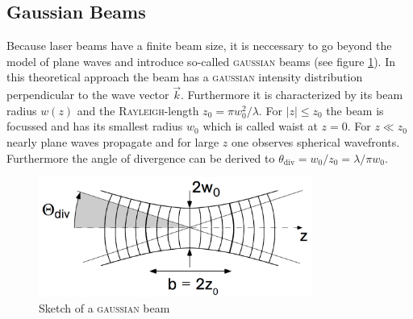 \documentclass{protokoll_en}
\begin{document}
\subsection{Gaussian Beams}
Because laser beams have a finite beam size, it is neccessary to go beyond the model of plane waves and introduce so-called \textsc{gaussian} beams (see figure \ref{fig:gaussianbeams}). In this theoretical approach the beam has a \textsc{gaussian} intensity distribution perpendicular to the wave vector $\vec{k}$. Furthermore it is characterized by its beam radius $w(z)$ and the \textsc{Rayleigh}-length $z_0 = \pi w^2_0/\lambda$. For $|z| \leq z_0$ the beam is focussed and has its smallest radius $w_0$ which is called waist at $z=0$. For $z \ll z_0$ nearly plane waves propagate and for large $z$ one observes spherical wavefronts. Furthermore the angle of divergence can be derived to $\theta_{\mathrm{div}} = w_0/z_0 = \lambda/\pi w_0$.
\begin{figure}[H]
	\centering
		\includegraphics[width=0.8\textwidth]{graphics/gaussianbeams}
	\caption{Sketch of a \textsc{gaussian} beam~\cite{meschi}}
	\label{fig:gaussianbeams}
\end{figure}
\end{document}
